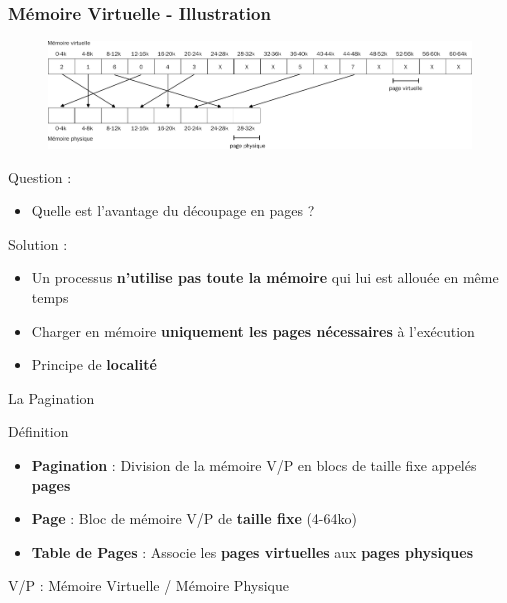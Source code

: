 \documentclass[8pt]{beamer}
\begin{document}
\begin{frame}[c]
    \frametitle{Mémoire Virtuelle - Illustration}
    \begin{figure}
        \centering

        \includegraphics[width=\textwidth]{figures/memoire_virtuelle_physique.pdf}
    \end{figure}
    \begin{alertblock}{Question : }
        \begin{itemize}
            \item
                  Quelle est l'avantage du d\'ecoupage en pages ?
        \end{itemize}
    \end{alertblock}
    \pause
    \begin{exampleblock}{Solution :}
        \begin{itemize}
            \item Un processus \textbf{n'utilise pas toute la mémoire} qui
                  lui est
                  allouée en même
                  temps
            \item Charger en mémoire \textbf{uniquement les pages nécessaires}
                  à
                  l'exécution
            \item Principe de \textbf{localité}
        \end{itemize}
    \end{exampleblock}

\end{frame}

\begin{frame}{La Pagination}
    \begin{block}{D\'efinition}
        \begin{itemize}
            \item \textbf{Pagination} : Division de la mémoire V/P	en
                  blocs de taille fixe appelés \textbf{pages}
            \item \textbf{Page} : Bloc de mémoire V/P de \textbf{taille fixe}
                  (4-64ko)
            \item \textbf{Table de Pages} : Associe les \textbf{pages
                      virtuelles} aux \textbf{pages physiques}
        \end{itemize}
        V/P : Mémoire Virtuelle / Mémoire Physique
    \end{block}
\end{frame}
\end{document}
